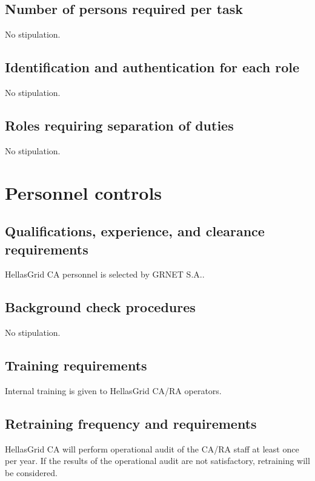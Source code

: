 \subsection{Number of persons required per task}

No stipulation.

\subsection{Identification and authentication for each role}

No stipulation.

\subsection{Roles requiring separation of duties}

No stipulation.

\section{Personnel controls}
\subsection{Qualifications, experience, and clearance requirements}

HellasGrid CA personnel is selected by GRNET S.A..

\subsection{Background check procedures}

No stipulation.

\subsection{Training requirements}

Internal training is given to HellasGrid CA/RA operators.

\subsection{Retraining frequency and requirements}
\label{sub:RetrainingFrequencyAndRequirements}

HellasGrid CA will perform operational audit of the CA/RA staff at least once per year. If the results of the operational audit are not satisfactory, retraining will be considered.


